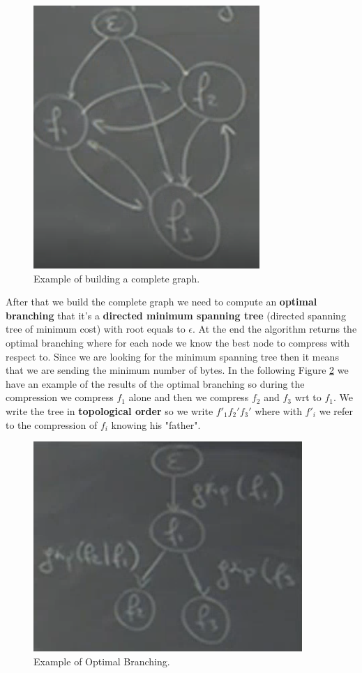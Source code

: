 \begin{figure}
    \centering
    \includegraphics[width=0.75\linewidth]{images/completegraph.PNG}
    \caption{Example of building a complete graph.}
    \label{fig:completegraph}
\end{figure}
After that we build the complete graph we need to compute an \textbf{optimal branching} that it's a \textbf{directed minimum spanning tree} (directed spanning tree of minimum cost) with root equals to $\epsilon$. At the end the algorithm returns the optimal branching where for each node we know the best node to compress with respect to. Since we are looking for the minimum spanning tree then it means that we are sending the minimum number of bytes. In the following Figure \ref{fig:optimalbranching} we have an example of the results of the optimal branching so during the compression we compress $f_1$ alone and then we compress $f_2$ and $f_3$ wrt to $f_1$. We write the tree in \textbf{topological order} so we write $f'_1f_2'f_3'$ where with $f'_i$ we refer to the compression of $f_i$ knowing his "father".\newline
\begin{figure}
    \centering
    \includegraphics[width=0.75\linewidth]{images/optimalbranching.PNG}
    \caption{Example of Optimal Branching.}
    \label{fig:optimalbranching}
\end{figure}
